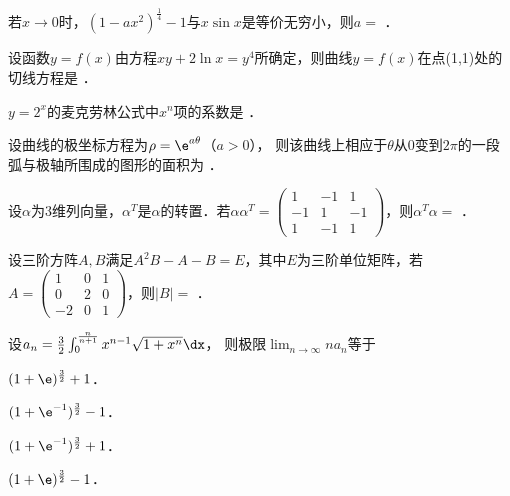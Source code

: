 \documentclass[plain,noanswer,medmath]{../../template/jnuexam}
\begin{document}






\begin{problem}
若$x \to 0$时，$(1 - ax^2)^{\frac{1}{4}} - 1$与$x\sin x$是等价无穷小，则$a =$ \fillin{}．
\end{problem}


\begin{problem}
设函数$y = f(x)$由方程$xy + 2\ln x = y^4$所确定，则曲线$y = f(x)$在点(1,1)处的切线方程是 \fillin{}．
\end{problem}


\begin{problem}
$y = 2^x$的麦克劳林公式中$x^n$项的系数是 \fillin{}．
\end{problem}


\begin{problem}
设曲线的极坐标方程为$\rho = \e^{a\theta}$（$a > 0$），
则该曲线上相应于$\theta$从$0$变到$2\pi$的一段弧与极轴所围成的图形的面积为 \fillin{}．
\end{problem}


\begin{problem}
设$\alpha$为$3$维列向量，$\alpha^T$是$\alpha$的转置．若$\alpha \alpha^T = \begin{pmatrix}
   1 & -1 & 1 \\
  -1 &  1 & -1 \\
   1 & -1 & 1
\end{pmatrix}$，则$\alpha^T\alpha =$ \fillin{}．
\end{problem}


\begin{problem}
设三阶方阵$A,B$满足$A^2 B - A - B = E$，其中$E$为三阶单位矩阵，若$A = \begin{pmatrix}
   1 & 0 & 1 \\
   0 & 2 & 0 \\
  -2 & 0 & 1
\end{pmatrix}$，则$|B| =$ \fillin{}．
\end{problem}






\begin{problem}
设$a_n = \frac{3}{2}\int_0^{\frac{n}{n + 1}} x^{n - 1} \sqrt{1 + x^n} \dx$，
则极限$\lim_{n \to \infty} na_n$等于\pickout{}
\begin{abcd}
\item $(1 + \e)^{\frac{3}{2}} + 1$．
\item $(1 + \e^{-1})^{\frac{3}{2}} - 1$．
\item $(1 + \e^{-1})^{\frac{3}{2}} + 1$．
\item $(1 + \e)^{\frac{3}{2}} - 1$．
\end{abcd}
\end{problem}
\end{document}
